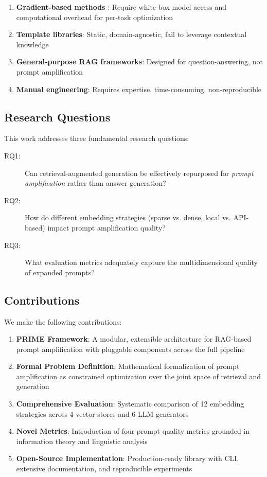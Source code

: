 \documentclass[11pt,a4paper]{article}
\begin{document}
\begin{enumerate}
    \item \textbf{Gradient-based methods} \cite{shin2020autoprompt}: Require white-box model access and computational overhead for per-task optimization
    \item \textbf{Template libraries}: Static, domain-agnostic, fail to leverage contextual knowledge
    \item \textbf{General-purpose RAG frameworks}: Designed for question-answering, not prompt amplification
    \item \textbf{Manual engineering}: Requires expertise, time-consuming, non-reproducible
\end{enumerate}

\subsection{Research Questions}

This work addresses three fundamental research questions:

\begin{description}
    \item[RQ1:] Can retrieval-augmented generation be effectively repurposed for \textit{prompt amplification} rather than answer generation?
    \item[RQ2:] How do different embedding strategies (sparse vs. dense, local vs. API-based) impact prompt amplification quality?
    \item[RQ3:] What evaluation metrics adequately capture the multidimensional quality of expanded prompts?
\end{description}

\subsection{Contributions}

We make the following contributions:

\begin{enumerate}
    \item \textbf{PRIME Framework}: A modular, extensible architecture for RAG-based prompt amplification with pluggable components across the full pipeline
    
    \item \textbf{Formal Problem Definition}: Mathematical formalization of prompt amplification as constrained optimization over the joint space of retrieval and generation
    
    \item \textbf{Comprehensive Evaluation}: Systematic comparison of 12 embedding strategies across 4 vector stores and 6 LLM generators
    
    \item \textbf{Novel Metrics}: Introduction of four prompt quality metrics grounded in information theory and linguistic analysis
    
    \item \textbf{Open-Source Implementation}: Production-ready library with CLI, extensive documentation, and reproducible experiments
\end{enumerate}
\end{document}
